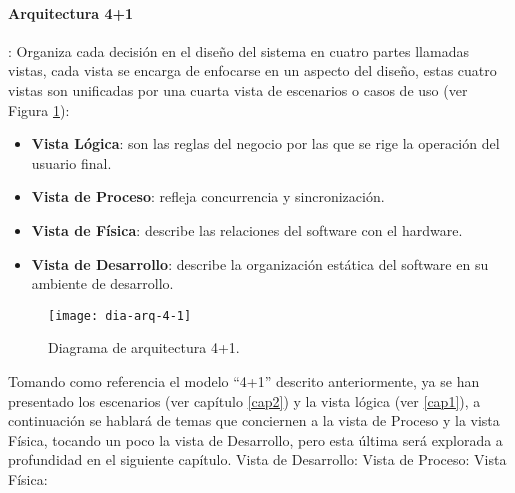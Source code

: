 \paragraph{Arquitectura 4+1}: Organiza cada decisión en el diseño del sistema en cuatro partes llamadas vistas, cada vista se encarga de enfocarse en un aspecto del diseño, estas cuatro vistas son unificadas por una cuarta vista de escenarios o casos de uso (ver Figura \ref{fig:dia-arq-4-1}):
\begin{itemize}
	\item \textbf{Vista Lógica}: son las reglas del negocio por las que se rige la operación del usuario final.
	\item \textbf{Vista de Proceso}: refleja concurrencia y sincronización.
	\item \textbf{Vista de Física}: describe las relaciones del software con el hardware.
	\item \textbf{Vista de Desarrollo}: describe la organización estática del software en su ambiente de desarrollo.\cite{ViewModel4plus1}
\end{itemize}

\begin{figure}[h]
\centering
\texttt{[image: dia-arq-4-1]} 
\caption{Diagrama de arquitectura 4+1.}
\label{fig:dia-arq-4-1}
\end{figure}

Tomando como referencia el modelo ``4+1'' descrito anteriormente, ya se han presentado los escenarios (ver capítulo \ref{cap2}) y la vista lógica (ver \ref{cap1}), a continuación se hablará de temas que conciernen a la vista de Proceso y la vista Física, tocando un poco la vista de Desarrollo, pero esta última será explorada a profundidad en el siguiente capítulo.
Vista de Desarrollo:
Vista de Proceso:
Vista Física:




